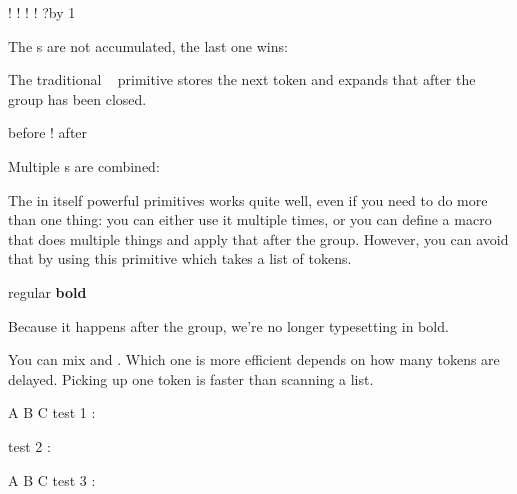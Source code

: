 \startbuffer
\afterassignment !\def\MyMacro {}\quad
\afterassignment !\let\MyMacro ?\quad
\afterassignment !\quad
\afterassignment !%
\afterassignment ?\advance\scratchcounter by 1
\stopbuffer

\typebuffer

The s are not accumulated, the last one wins:

{\getbuffer}

\stopoldprimitive

\startoldprimitive[title={\prm {aftergroup}}]

The traditional \TEX\  primitive stores the next token and
expands that after the group has been closed.

\startbuffer
before{ ! \aftergroup a\aftergroup f\aftergroup t\aftergroup e\aftergroup r}
\stopbuffer

Multiple s are combined:

\typebuffer

\getbuffer

\stopoldprimitive

\startnewprimitive[title={\prm {aftergrouped}}]

The in itself powerful  primitives works quite well, even
if you need to do more than one thing: you can either use it multiple times, or
you can define a macro that does multiple things and apply that after the group.
However, you can avoid that by using this primitive which takes a list of tokens.

\startbuffer
regular
\bgroup
{}%
\bf bold
\egroup
\stopbuffer

\typebuffer

Because it happens after the group, we're no longer typesetting in bold.

{\getbuffer}

You can mix  and . Which one is more
efficient depends on how many tokens are delayed. Picking up one token is faster
than scanning a list.

\startbuffer
{
    \aftergroup A \aftergroup B \aftergroup C
test 1 : }

{
test 2 : }


{
    \aftergroup A 
    \aftergroup B 
    \aftergroup C 
test 3 : }

